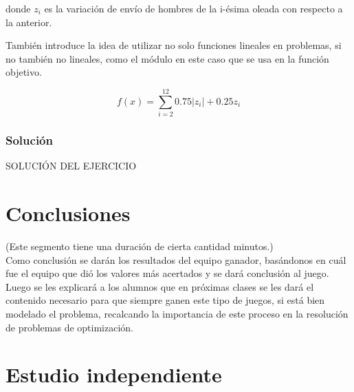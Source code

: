 \documentclass[a4paper,10pt,twocolumn]{article}
\theoremstyle{theorem}
\theoremstyle{definition}
\theoremstyle{remark}
\begin{document}
donde $z_i$ es la variación de envío de hombres de la i-ésima oleada con respecto a la anterior.

También introduce la idea de utilizar no solo funciones lineales en problemas, si no también no lineales, como el módulo en este caso que se usa en la función objetivo.

$$
f(x) = \sum_{i=2}^{12} 0.75 |z_i| + 0.25 z_i
$$

		\subsubsection{Solución}\label{subsubsec:sol_ejer_5}

SOLUCIÓN DEL EJERCICIO


\section{Conclusiones} \label{sec:conc}

(Este segmento tiene una duración de cierta cantidad minutos.)\\
 
%

Como conclusión se darán los resultados del equipo ganador, basándonos en cuál fue el equipo que dió los valores más acertados y se dará conclusión al juego.\\

Luego se les explicará a los alumnos que en próximas clases se les dará el contenido necesario para que siempre ganen este tipo de juegos, si está bien modelado el problema, recalcando la importancia de este proceso en la resolución de problemas de optimización.

\section{Estudio independiente} \label{independ}
\end{document}
